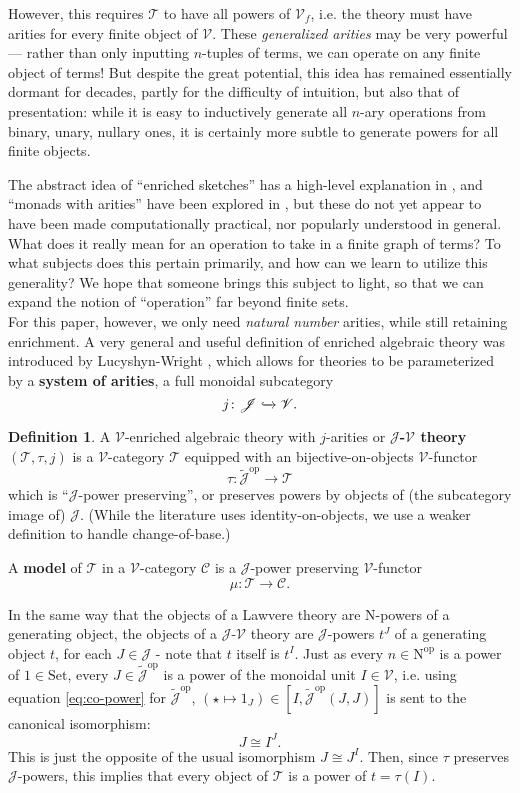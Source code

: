 \documentclass{amsart}
\theoremstyle{definition}
\newtheorem*{definition*}{Definition}
\newcommand{\Set}{\mathrm{Set}}
\newcommand{\op}{\mathrm{op}}
\newcommand{\NN}{\mathrm{N}}
\newcommand{\V}{\mathscr{V}}
\newcommand{\C}{\mathscr{C}}
\newcommand{\J}{\mathscr{J}}
\newcommand{\T}{\mathscr{T}}
\newcommand{\maps}{\colon}
\begin{document}
However, this requires $\T$ to have all powers of $\V_f$, i.e. the theory must have arities for every finite object of $\V$. These \textit{generalized arities} may be very powerful --- rather than only inputting $n$-tuples of terms, we can operate on any finite object of terms! But despite the great potential, this idea has remained essentially dormant for decades, partly for the difficulty of intuition, but also that of presentation: while it is easy to inductively generate all $n$-ary operations from binary, unary, nullary ones, it is certainly more subtle to generate powers for all finite objects.

The abstract idea of ``enriched sketches'' has a high-level explanation in \cite{powsketch}, and ``monads with arities'' have been explored in \cite{mndarty}, but these do not yet appear to have been made computationally practical, nor popularly understood in general. What does it really mean for an operation to take in a finite graph of terms? To what subjects does this pertain primarily, and how can we learn to utilize this generality? We hope that someone brings this subject to light, so that we can expand the notion of ``operation'' far beyond finite sets.\\

For this paper, however, we only need \textit{natural number} arities, while still retaining enrichment. A very general and useful definition of enriched algebraic theory was introduced by Lucyshyn-Wright \cite{rbb}, which allows for theories to be parameterized by a \textbf{system of arities}, a full monoidal subcategory $$j\maps \J \xhookrightarrow{} \V.$$

\begin{definition*}
	A $\V$-enriched algebraic theory with $j$-arities or \textbf{$\J$-$\V$ theory} $(\T,\tau,j)$ is a $\V$-category $\T$ equipped with an bijective-on-objects $\V$-functor $$\tau\maps\tilde{\J}^\op \to \T$$ which is ``$\J$-power preserving'', or preserves powers by objects of (the subcategory image of) $\J$. \newline
	(While the literature uses identity-on-objects, we use a weaker definition to handle change-of-base.)
\end{definition*}

A \textbf{model} of $\T$ in a $\V$-category $\C$ is a $\J$-power preserving $\V$-functor $$\mu: \T \to \C.$$

In the same way that the objects of a Lawvere theory are $\NN$-powers of a generating object, the objects of a $\J$-$\V$ theory are $\J$-powers $t^J$ of a generating object $t$, for each $J \in \J$ - note that $t$ itself is $t^I$. Just as every $n\in \NN^\op$ is a power of $1 \in \Set$, every $J\in \tilde{\J}^{\op}$ is a power of the monoidal unit $I\in \V$, i.e. using equation \ref{eq:co-power} for $\tilde{\J}^{\op}$, $(\star \mapsto 1_J) \in [I,\tilde{\J}^{\op}(J,J)]$ is sent to the canonical isomorphism:
\begin{equation}
J \cong I^J.
\end{equation}
This is just the opposite of the usual isomorphism $J \cong J^I$. Then, since $\tau$ preserves $\J$-powers, this implies that every object of $\T$ is a power of $t = \tau(I)$.
\end{document}
